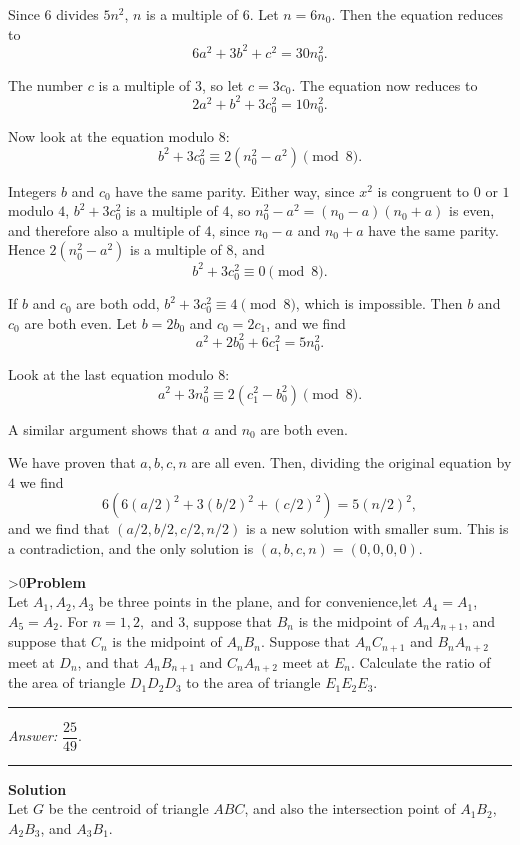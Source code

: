 \documentclass[12pt,oneside,a4paper]{book}
\newcounter{probnum}
\newcounter{solnum}
\newcommand{\prob}{\ifnum\value{probnum}>0\newpage\fi\setcounter{solnum}{0}\stepcounter{probnum}\textbf{Problem \theprobnum}\\}
\newcommand{\ans}{\medskip\hrule\medbreak\emph{Answer: }}
\newcommand{\sol}{\medskip\hrule\medbreak\textbf{Solution}\\}
\begin{document}
Since $6$ divides $5n^2$, $n$ is a multiple of $6$. Let $n = 6n_0$. Then the equation reduces to
\[6a^2 + 3b^2 + c^2 = 30n_0^2.\]

The number $c$ is a multiple of $3$, so let $c = 3c_0$. The equation now reduces to
\[2a^2 + b^2 + 3c_0^2 = 10n_0^2.\]

Now look at the equation modulo $8$:
\[b^2 + 3c_0^2 \equiv 2(n_0^2-a^2)\pmod 8.\]

Integers $b$ and $c_0$ have the same parity. Either way, since $x^2$ is congruent to $0$ or $1$ modulo $4$, $b^2 + 3c_0^2$ is a multiple of $4$, so $n_0^2 - a^2 = (n_0-a)(n_0+a)$ is even, and therefore also a multiple of $4$, since $n_0-a$ and $n_0+a$ have the same parity. Hence $2(n_0^2-a^2)$ is a multiple of $8$, and
\[b^2 + 3c_0^2 \equiv 0\pmod 8.\]

If $b$ and $c_0$ are both odd, $b^2+3c_0^2 \equiv 4\pmod 8$, which is impossible. Then $b$ and $c_0$ are both even. Let $b=2b_0$ and $c_0=2c_1$, and we find
\[a^2 + 2b_0^2 + 6c_1^2 = 5n_0^2.\]

Look at the last equation modulo $8$:
\[a^2 + 3n_0^2 \equiv 2(c_1^2 - b_0^2)\pmod 8.\]

A similar argument shows that $a$ and $n_0$ are both even.

We have proven that $a,b,c,n$ are all even. Then, dividing the original equation by $4$ we find
\[6(6(a/2)^2 + 3(b/2)^2 + (c/2)^2) = 5(n/2)^2,\]
and we find that $(a/2,b/2,c/2,n/2)$ is a new solution with smaller sum. This is a contradiction, and the only solution is $(a,b,c,n) = (0,0,0,0)$.

\prob Let $A_1, A_2, A_3$ be three points in the plane, and for convenience,let $A_4=A_1$, $A_5=A_2$. For $n=1,2,$ and $3$, suppose that $B_n$ is the midpoint of $A_nA_{n+1}$, and suppose that $C_n$ is the midpoint of $A_nB_n$. Suppose that $A_nC_{n+1}$ and $B_nA_{n+2}$ meet at $D_n$, and that $A_nB_{n+1}$ and $C_nA_{n+2}$ meet at $E_n$. Calculate the ratio of the area of triangle $D_1D_2D_3$ to the area of triangle $E_1E_2E_3$.

\ans $\dfrac{25}{49}$.

\sol
Let $G$ be the centroid of triangle $ABC$, and also the intersection point of $A_1B_2$, $A_2B_3$, and $A_3B_1$.
\end{document}
